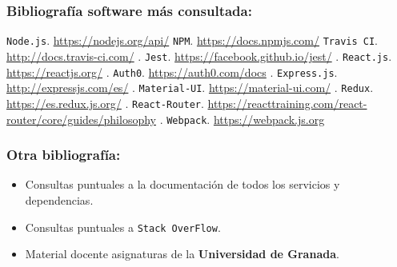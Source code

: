 \bigskip
\subsubsection*{Bibliografía software más consultada:}
 {\tt Node.js}. \url{https://nodejs.org/api/}
 {\tt NPM}. \url{https://docs.npmjs.com/}
 {\tt Travis CI}. \url{http://docs.travis-ci.com/}
. {\tt Jest}.  \url{https://facebook.github.io/jest/}
. {\tt React.js}.  \url{https://reactjs.org/}
. {\tt Auth0}.  \url{https://auth0.com/docs}
. {\tt Express.js}.  \url{http://expressjs.com/es/}
. {\tt Material-UI}.  \url{https://material-ui.com/}
. {\tt Redux}.  \url{https://es.redux.js.org/}
. {\tt React-Router}.  \url{https://reacttraining.com/react-router/core/guides/philosophy}
. {\tt Webpack}. \url{https://webpack.js.org}


\bigskip
\subsubsection*{Otra bibliografía:}
\begin{itemize}
  \item Consultas puntuales a la documentación de todos los servicios y dependencias.
	\item Consultas puntuales a {\tt Stack OverFlow}.
	\item Material docente asignaturas de la \textbf{Universidad de Granada}.
\end{itemize}
